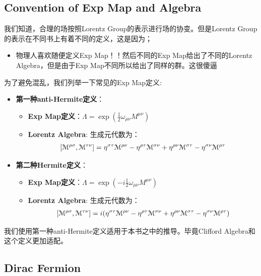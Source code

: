 \subsection{Convention of Exp Map and Algebra}

我们知道，合理的场按照Lorentz Group的表示进行场的协变。但是Lorentz Group的表示在不同书上有着不同的定义，这是因为；
\begin{itemize}
  \item 物理人喜欢随便定义Exp Map！！然后不同的Exp Map给出了不同的Lorentz Algebra，但是由于Exp Map不同所以给出了同样的群。这很傻逼
\end{itemize}
为了避免混乱，我们列举一下常见的Exp Map定义:
\begin{itemize}
  \item \textbf{第一种anti-Hermite定义}：

    \begin{itemize}
      \item \textbf{Exp Map定义}：$\Lambda = \exp(\displaystyle\frac{1}{2}\omega_{\mu\nu}M^{\mu\nu})$
      \item \textbf{Lorentz Algebra}: 生成元代数为：
        \begin{align}
          \large[\mathcal{M}^{\rho\sigma},\mathcal{M}^{\tau\nu}]=\eta^{\sigma\tau}\mathcal{M}^{\rho\nu}-\eta^{\rho\tau}\mathcal{M}^{\sigma\nu}+\eta^{\rho\nu}\mathcal{M}^{\sigma\tau}-\eta^{\sigma\nu}\mathcal{M}^{\rho\tau}
        \end{align}
    \end{itemize}
  \item \textbf{第二种Hermite定义}：
    \begin{itemize}
      \item \textbf{Exp Map定义}：$\Lambda = \exp(-i \displaystyle\frac{1}{2}\omega_{\mu\nu}M^{\mu\nu})$
      \item \textbf{Lorentz Algebra}: 生成元代数为：
        \begin{align}
          \large[\mathcal{M}^{\rho\sigma},\mathcal{M}^{\tau\nu}]=i(\eta^{\sigma\tau}\mathcal{M}^{\rho\nu}-\eta^{\rho\tau}\mathcal{M}^{\sigma\nu}+\eta^{\rho\nu}\mathcal{M}^{\sigma\tau}-\eta^{\sigma\nu}\mathcal{M}^{\rho\tau})
        \end{align}
    \end{itemize}
\end{itemize}
我们使用第一种anti-Hermite定义适用于本书之中的推导。毕竟Clifford Algebra和这个定义更加适配。

\subsection{Dirac Fermion}

